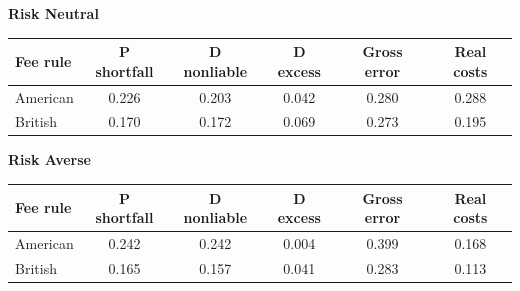 \documentclass[10pt,border=5pt,varwidth=17cm]{standalone}
\begin{document}
\begingroup
\small
\setlength{\tabcolsep}{5pt}
\renewcommand{\arraystretch}{1.20}
\noindent\textbf{Risk Neutral}\par\smallskip
\noindent\begin{tabularx}{\linewidth}{@{}>{\raggedright\arraybackslash}Xccccc@{}}
\toprule
\textbf{Fee rule} & \textbf{P shortfall} & \textbf{D nonliable} & \textbf{D excess} & \textbf{Gross error} & \textbf{Real costs} \\
\midrule
American & 0.226 & 0.203 & 0.042 & 0.280 & 0.288 \\
British & 0.170 & 0.172 & 0.069 & 0.273 & 0.195 \\
\bottomrule\end{tabularx}\par\medskip
\noindent\textbf{Risk Averse}\par\smallskip
\noindent\begin{tabularx}{\linewidth}{@{}>{\raggedright\arraybackslash}Xccccc@{}}
\toprule
\textbf{Fee rule} & \textbf{P shortfall} & \textbf{D nonliable} & \textbf{D excess} & \textbf{Gross error} & \textbf{Real costs} \\
\midrule
American & 0.242 & 0.242 & 0.004 & 0.399 & 0.168 \\
British & 0.165 & 0.157 & 0.041 & 0.283 & 0.113 \\
\bottomrule\end{tabularx}\par\medskip
\endgroup
\end{document}
